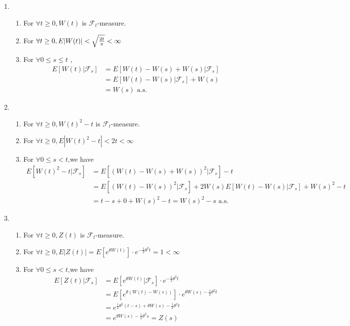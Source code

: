 \begin{enumerate}
    \item \begin{enumerate}
        \item For $\forall t \ge 0,W(t)$ is $\mathcal{F}_t$-measure.
        \item For $\forall t \ge 0,E|W(t)|<\sqrt{\frac{2t}{\pi}} < \infty$
        \item For $\forall 0 \le s \le t$ ,
            \begin{align*}
                E[W(t)\big|\mathcal{F}_s] 
                &= E[W(t)-W(s)+W(s)\big|\mathcal{F}_s]\\
                &= E[W(t)-W(s)\big|\mathcal{F}_s] + W(s)\\
                &= W(s)\mbox{ a.s.}
            \end{align*}
    \end{enumerate}
    \item \begin{enumerate}
        \item For $\forall t \ge 0,W(t)^2 - t$ is $\mathcal{F}_t$-measure.
        \item For $\forall t \ge 0,E|W(t)^2-t| < 2t < \infty $
        \item For $\forall 0\le s < t$,we have
        \begin{align*}
            E[W(t)^2 - t\big|\mathcal{F}_s]&= E[(W(t)-W(s)+W(s))^ 2\big|\mathcal{F}_s ] - t\\
            &=E[(W(t)-W(s))^2\big|\mathcal{F}_s]+ 2W(s)E[W(t)-W(s)\big|\mathcal{F}_s] + W(s)^2 - t\\
            &=t-s+0+W(s)^2-t = W(s)^2 - s\mbox{ a.s.}
        \end{align*}
    \end{enumerate}
    \item \begin{enumerate}
        \item For $\forall t \ge 0 , Z(t)$ is $\mathcal{F}_t$-measure.
        \item For $\forall t \ge 0,E|Z(t)| = E[e^{\theta W(t)}]\cdot e^{-\frac{1}{2}\theta^2 t } = 1 < \infty$
        \item For $\forall 0\le s < t$,we have
        \begin{align*}
            E[Z(t)\big|\mathcal{F}_s] &= E[e^{\theta W(t)}\big|\mathcal{F}_s]\cdot e^{-\frac{1}{2}\theta^2t}\\
            &= E[e^{\theta (W(t) - W(s))}]\cdot e^{\theta W(s) - \frac{1}{2}\theta ^2 t}\\
            &= e^{\frac{1}{2}\theta^2(t-s)+\theta W(s) - \frac{1}{2}\theta^2 t}\\
            &= e^{\theta W(s) - \frac{1}{2} \theta ^2s} = Z(s)
        \end{align*}   
    \end{enumerate}
\end{enumerate}





